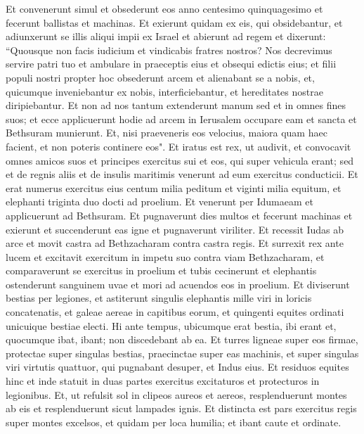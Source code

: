 \begin{biblechapter}
\verse Et convenerunt simul et obsederunt eos anno centesimo quinquagesimo et fecerunt ballistas et machinas. 
\verse Et exierunt quidam ex eis, qui obsidebantur, et adiunxerunt se illis aliqui impii ex Israel 
\verse et abierunt ad regem et dixerunt: “Quousque non facis iudicium et vindicabis fratres nostros? 
\verse Nos decrevimus servire patri tuo et ambulare in praeceptis eius et obsequi edictis eius; 
\verse et filii populi nostri propter hoc obsederunt arcem et alienabant se a nobis, et, quicumque inveniebantur ex nobis, interficiebantur, et hereditates nostrae diripiebantur. 
\verse Et non ad nos tantum extenderunt manum sed et in omnes fines suos; 
\verse et ecce applicuerunt hodie ad arcem in Ierusalem occupare eam et sancta et Bethsuram munierunt. 
\verse Et, nisi praeveneris eos velocius, maiora quam haec facient, et non poteris continere eos". 
\verse Et iratus est rex, ut audivit, et convocavit omnes amicos suos et principes exercitus sui et eos, qui super vehicula erant; 
\verse sed et de regnis aliis et de insulis maritimis venerunt ad eum exercitus conducticii. 
\verse Et erat numerus exercitus eius centum milia peditum et viginti milia equitum, et elephanti triginta duo docti ad proelium. 
\verse Et venerunt per Idumaeam et applicuerunt ad Bethsuram. Et pugnaverunt dies multos et fecerunt machinas et exierunt et succenderunt eas igne et pugnaverunt viriliter. 
\verse Et recessit Iudas ab arce et movit castra ad Bethzacharam contra castra regis. 
\verse Et surrexit rex ante lucem et excitavit exercitum in impetu suo contra viam Bethzacharam, et comparaverunt se exercitus in proelium et tubis cecinerunt  
\verse et elephantis ostenderunt sanguinem uvae et mori ad acuendos eos in proelium.  
\verse Et diviserunt bestias per legiones, et astiterunt singulis elephantis mille viri in loricis concatenatis, et galeae aereae in capitibus eorum, et quingenti equites ordinati unicuique bestiae electi. 
\verse Hi ante tempus, ubicumque erat bestia, ibi erant et, quocumque ibat, ibant; non discedebant ab ea. 
\verse Et turres ligneae super eos firmae, protectae super singulas bestias, praecinctae super eas machinis, et super singulas viri virtutis quattuor, qui pugnabant desuper, et Indus eius. 
\verse Et residuos equites hinc et inde statuit in duas partes exercitus excitaturos et protecturos in legionibus. 
\verse Et, ut refulsit sol in clipeos aureos et aereos, resplenduerunt montes ab eis et resplenduerunt sicut lampades ignis. 
\verse Et distincta est pars exercitus regis super montes excelsos, et quidam per loca humilia; et ibant caute et ordinate. 

\end{biblechapter}
